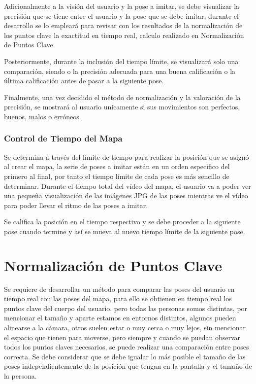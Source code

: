 Adicionalmente a la visión del usuario y la pose a imitar, se debe visualizar la precisión que se tiene entre el usuario y la pose que se debe imitar, durante el desarrollo se lo empleará para revisar con los resultados de la normalización de los puntos clave la exactitud en tiempo real, calculo realizado en Normalización de Puntos Clave. 

Posteriormente, durante la inclusión del tiempo límite, se visualizará solo una comparación, siendo o la precisión adecuada para una buena calificación o la última calificación antes de pasar a la siguiente pose.

Finalmente, una vez decidido el método de normalización y la valoración de la precisión, se mostrará al usuario unicamente si sus movimientos son perfectos, buenos, malos o erróneos.

\subsubsection{Control de Tiempo del Mapa}

Se determina a través del límite de tiempo para realizar la posición que se asignó al crear el mapa, la serie de poses a imitar están en un orden específico del primero al final, por tanto el tiempo límite de cada pose es más sencillo de determinar. Durante el tiempo total del vídeo del mapa, el usuario va a poder ver una pequeña visualización de las imágenes JPG de las poses mientras ve el vídeo para poder llevar el ritmo de las poses a imitar.

Se califica la posición en el tiempo respectivo y se debe proceder a la siguiente pose cuando termine y así se mueva al nuevo tiempo límite de la siguiente pose.


\section{Normalización de Puntos Clave}

Se requiere de desarrollar un método para comparar las poses del usuario en tiempo real con las poses del mapa, para ello se obtienen en tiempo real los puntos clave del cuerpo del usuario, pero todas las personas somos distintas, por mencionar el tamaño y aparte estamos en entornos distintos, algunos pueden alinearse a la cámara, otros suelen estar o muy cerca o muy lejos, sin mencionar el espacio que tienen para moverse, pero siempre y cuando se puedan observar todos los puntos claves necesarios, se puede realizar una comparación entre poses correcta. Se debe considerar que se debe igualar lo más posible el tamaño de las poses independientemente de la posición que tengan en la pantalla y el tamaño de la persona.

